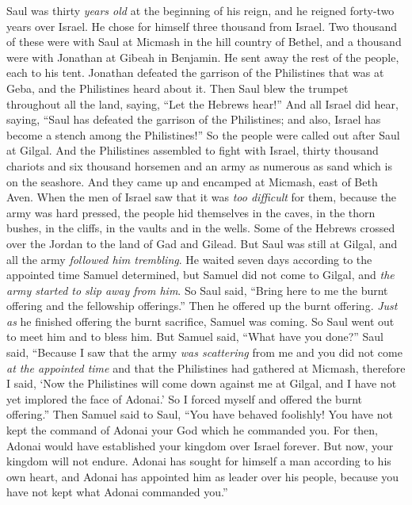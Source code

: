 \begin{biblechapter} %
 Saul was thirty \textit{years old} at the beginning of his reign, and he reigned forty-two years over Israel.
\verse He chose for himself three thousand from Israel. Two thousand of these were with Saul at Micmash in the hill country of Bethel, and a thousand were with Jonathan at Gibeah in Benjamin. He sent away the rest of the people, each to his tent.
\verse Jonathan defeated the garrison of the Philistines that was at Geba, and the Philistines heard about it. Then Saul blew the trumpet throughout all the land, saying, “Let the Hebrews hear!”
\verse And all Israel did hear, saying, “Saul has defeated the garrison of the Philistines; and also, Israel has become a stench among the Philistines!” So the people were called out after Saul at Gilgal.
 And the Philistines assembled to fight with Israel, thirty thousand chariots and six thousand horsemen and an army as numerous as sand which is on the seashore. And they came up and encamped at Micmash, east of Beth Aven.
\verse When the men of Israel saw that it was \textit{too difficult} for them, because the army was hard pressed, the people hid themselves in the caves, in the thorn bushes, in the cliffs, in the vaults and in the wells.
\verse Some of the Hebrews crossed over the Jordan to the land of Gad and Gilead. But Saul was still at Gilgal, and all the army \textit{followed him trembling}.
\verse He waited seven days according to the appointed time Samuel determined, but Samuel did not come to Gilgal, and \textit{the army started to slip away from him}.
\verse So Saul said, “Bring here to me the burnt offering and the fellowship offerings.” Then he offered up the burnt offering.
\verse \textit{Just as} he finished offering the burnt sacrifice, Samuel was coming. So Saul went out to meet him and to bless him.
\verse But Samuel said, “What have you done?” Saul said, “Because I saw that the army \textit{was scattering} from me and you did not come \textit{at the appointed time} and that the Philistines had gathered at Micmash,
\verse therefore I said, ‘Now the Philistines will come down against me at Gilgal, and I have not yet implored the face of Adonai.’ So I forced myself and offered the burnt offering.”
\verse Then Samuel said to Saul, “You have behaved foolishly! You have not kept the command of Adonai your God which he commanded you. For then, Adonai would have established your kingdom over Israel forever.
\verse But now, your kingdom will not endure. Adonai has sought for himself a man according to his own heart, and Adonai has appointed him as leader over his people, because you have not kept what Adonai commanded you.”

\end{biblechapter}
